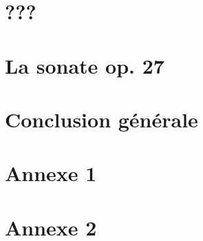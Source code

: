 \documentclass[]{music}
\begin{document}




\newpage
\strut\thispagestyle{empty}
\newpage



\newpage
\strut\thispagestyle{empty}
\newpage

\newpage
\strut\thispagestyle{empty}
\newpage
\tableofcontents
\newpage
\strut\thispagestyle{empty}
\newpage


\part{???}




\part{La sonate op. 27}




\part{Conclusion générale}




\part*{Annexe 1}




\part*{Annexe 2}
\end{document}
